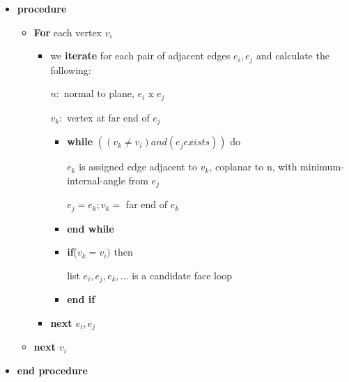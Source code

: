 \documentclass[12pt]{article}
\begin{document}
\begin{itemize}

    \item \textbf{procedure}
    \begin{itemize}
        \item \textbf{For} each vertex $ v_i $  
        \begin{itemize}
            \item we \textbf{iterate} for each pair of adjacent edges $ e_i, e_j$ and calculate the following:
    
    
                $ n :$ normal to plane, $e_i$ x $e_j$
    
    
                $ v_k :$ vertex at far end of $e_j $
                
            \begin{itemize}
                \item \textbf{while} $((v_k \neq v_i) and (e_j exists)) $ do
    
    
                     $e_k$ is assigned edge adjacent to $v_k$, coplanar to n, with minimum-internal-angle from $e_j$
    
                    $ e_j = e_k ; v_k =$ far end of $e_k$
                \item \textbf{end while}
                
                \item \textbf{if}($ v_k = v_i) $ then
    
                        list $e_i, e_j, e_k, ...$ is a candidate face loop 
                \item \textbf{end if}
            \end{itemize}
        \item \textbf{next $e_i,e_j$}
        \end{itemize}
        
    \item \textbf{next $v_i$}
    \end{itemize}
    
    
    \item \textbf{end procedure}
    
    
    
\end{itemize}
\end{document}

